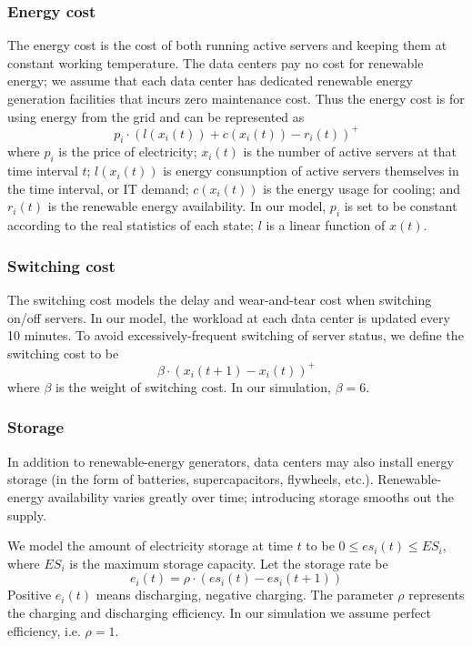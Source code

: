 \documentclass{acm_proc_article-sp}
\begin{document}
\subsubsection{Energy cost}
The energy cost is the cost of both running active servers and keeping them at constant working temperature. The data centers pay no cost for renewable energy; we assume that each data center has dedicated renewable energy generation facilities that incurs zero maintenance cost. Thus the energy cost is for using energy from the grid and can be represented as
\begin{equation}
p_i \cdot (l(x_i(t)) + c(x_i(t)) - r_i(t))^+
\end{equation}
where $p_i$ is the price of electricity; $x_i(t)$ is the number of active servers at that time interval $t$; $l(x_i(t))$ is energy consumption of active servers themselves in the time interval, or IT demand; $c(x_i(t))$ is the energy usage for cooling; and $r_i(t)$ is the renewable energy availability. In our model, $p_i$ is set to be constant according to the real statistics of each state; $l$ is a linear function of $x(t)$.

\subsubsection{Switching cost}
The switching cost models the delay and wear-and-tear cost when switching on/off servers. In our model, the workload at each data center is updated every 10 minutes. To avoid excessively-frequent switching of server status, we define the switching cost to be
$$\beta \cdot (x_i(t+1) - x_i(t))^+$$
where $\beta$ is the weight of switching cost. In our simulation, $\beta = 6$.

\subsubsection{Storage}
In addition to renewable-energy generators, data centers may also install energy storage (in the form of batteries, supercapacitors, flywheels, etc.). Renewable-energy availability varies greatly over time; introducing storage smooths out the supply.

We model the amount of electricity storage at time $t$ to be $0 \leq es_i(t) \leq ES_i$, where $ES_i$ is the maximum storage capacity. Let the storage rate be
$$e_i(t) = \rho \cdot (es_i(t) - es_i(t+1))$$
Positive $e_i(t)$ means discharging, negative charging. The parameter $\rho$ represents the charging and discharging efficiency. In our simulation we assume perfect efficiency, i.e. $\rho = 1$.
\end{document}
